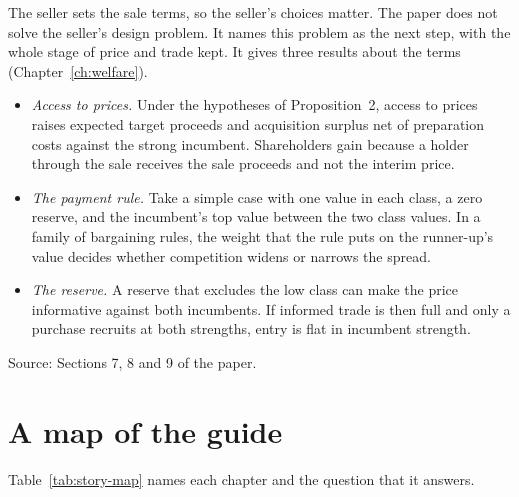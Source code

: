 The seller sets the sale terms, so the seller's choices matter. The paper does not solve the seller's design problem. It names this problem as the next step, with the whole stage of price and trade kept. It gives three results about the terms (Chapter~\ref{ch:welfare}).
\begin{itemize}
\item \emph{Access to prices.} Under the hypotheses of Proposition~2, access to prices raises expected target proceeds and acquisition surplus net of preparation costs against the strong incumbent. Shareholders gain because a holder through the sale receives the sale proceeds and not the interim price.
\item \emph{The payment rule.} Take a simple case with one value in each class, a zero reserve, and the incumbent's top value between the two class values. In a family of bargaining rules, the weight that the rule puts on the runner-up's value decides whether competition widens or narrows the spread.
\item \emph{The reserve.} A reserve that excludes the low class can make the price informative against both incumbents. If informed trade is then full and only a purchase recruits at both strengths, entry is flat in incumbent strength.
\end{itemize}

{\small\color{notegrey}Source: Sections 7, 8 and 9 of the paper.}

\section{A map of the guide}\label{sec:story-map}

Table~\ref{tab:story-map} names each chapter and the question that it answers.

